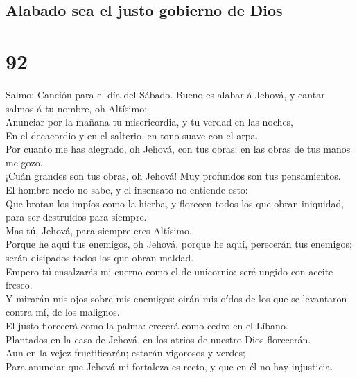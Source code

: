 \hypertarget{alabado-sea-el-justo-gobierno-de-dios}{%
\subsection{Alabado sea el justo gobierno de
Dios}\label{alabado-sea-el-justo-gobierno-de-dios}}

\hypertarget{section-91}{%
\section{92}\label{section-91}}

 Salmo: Canción para el día del Sábado. Bueno es alabar á
Jehová, y cantar salmos á tu nombre, oh Altísimo;\\
 Anunciar por la mañana tu misericordia, y tu verdad en
las noches,\\
 En el decacordio y en el salterio, en tono suave con el
arpa.\\
 Por cuanto me has alegrado, oh Jehová, con tus obras; en
las obras de tus manos me gozo.\\
 ¡Cuán grandes son tus obras, oh Jehová! Muy profundos son
tus pensamientos.\\
 El hombre necio no sabe, y el insensato no entiende
esto:\\
 Que brotan los impíos como la hierba, y florecen todos
los que obran iniquidad, para ser destruídos para siempre.\\
 Mas tú, Jehová, para siempre eres Altísimo.\\
 Porque he aquí tus enemigos, oh Jehová, porque he aquí,
perecerán tus enemigos; serán disipados todos los que obran maldad.\\
 Empero tú ensalzarás mi cuerno como el de unicornio:
seré ungido con aceite fresco.\\
 Y mirarán mis ojos sobre mis enemigos: oirán mis oídos
de los que se levantaron contra mí, de los malignos.\\
 El justo florecerá como la palma: crecerá como cedro en
el Líbano.\\
 Plantados en la casa de Jehová, en los atrios de nuestro
Dios florecerán.\\
 Aun en la vejez fructificarán; estarán vigorosos y
verdes;\\
 Para anunciar que Jehová mi fortaleza es recto, y que en
él no hay injusticia.

